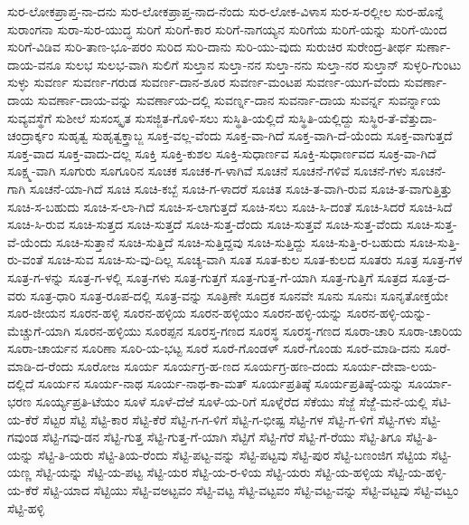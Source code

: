 ಸುರ-ಲೋಕಪ್ರಾಪ್ತ-ನಾ-ದನು
ಸುರ-ಲೋಕಪ್ರಾಪ್ತ-ನಾದ-ನೆಂದು
ಸುರ-ಲೋಕ-ವಿಳಾಸ
ಸುರ-ಸ-ರಲ್ಲೀಲ
ಸುರ-ಹೊನ್ನೆ
ಸುರಾಂಗನಾ
ಸುರಾ-ಸುರ-ಯುದ್ಧ
ಸುರಿಗೆ
ಸುರಿಗೆ-ಕಾರ
ಸುರಿಗೆ-ನಾಗಯ್ಯನ
ಸುರಿಗೆಯ
ಸುರಿಗೆ-ಯನ್ನು
ಸುರಿಗೆ-ಯಿಂದ
ಸುರಿಗೆ-ವಿಡಿವ
ಸುರಿ-ತಾಣ-ಭೂ-ಪರಂ
ಸುರಿದ
ಸುರಿ-ದಾನು
ಸುರಿ-ಯು-ವುದು
ಸುರುಚಿರ
ಸುರೇಂದ್ರ-ತೀರ್ಥ
ಸುರ್ಣಾ-ದಾಯ-ವನೂ
ಸುಲಭ
ಸುಲಭ-ವಾಗಿ
ಸುಲಿಗೆ
ಸುಲ್ತಾನ
ಸುಲ್ತಾ-ನನ
ಸುಲ್ತಾ-ನನು
ಸುಲ್ತಾ-ನರ
ಸುಲ್ತಾನ್
ಸುಳ್ಳರಿ-ಗುಂಟು
ಸುಳ್ಳು
ಸುವರ್ಣ
ಸುವರ್ಣ-ಗರುಡ
ಸುವರ್ಣ-ದಾನ-ಶೂರ
ಸುವರ್ಣ-ಮಂಟಪ
ಸುವರ್ಣ-ಯುಗ-ವೆಂದು
ಸುವರ್ಣಾ-ದಾಯ
ಸುವರ್ಣಾ-ದಾಯ-ವನ್ನು
ಸುವರ್ಣಾಯ-ದಲ್ಲಿ
ಸುವರ್ಣ್ನ-ದಾನ
ಸುವರ್ನಾ-ದಾಯ
ಸುವರ್ನ್ನ
ಸುವರ್ನ್ನಾಯ
ಸುವ್ಯವಸ್ಥೆಗೆ
ಸುಶೀಲೆ
ಸುಸಂಸ್ಕೃತ
ಸುಸಜ್ಜಿತ-ಗೊಳಿ-ಸಲು
ಸುಸ್ಥಿತಿ-ಯಲ್ಲಿದೆ
ಸುಸ್ಥಿತಿ-ಯಲ್ಲಿದ್ದು
ಸುಸ್ಥಿರ-ತೆ-ವೆತ್ತುದಾ-ಚಂದ್ರಾರ್ಕ್ಕಂ
ಸುಹೃತ್ವ
ಸುಹೃತ್ವಕ್ತ್ರಾಬ್ಜ
ಸೂಕ್ತ-ವಲ್ಲ-ವೆಂದು
ಸೂಕ್ತ-ವಾ-ಗಿದೆ
ಸೂಕ್ತ-ವಾಗಿ-ದೆ-ಯೆಂದು
ಸೂಕ್ತ-ವಾಗುತ್ತದೆ
ಸೂಕ್ತ-ವಾದ
ಸೂಕ್ತ-ವಾದು-ದಲ್ಲ
ಸೂಕ್ತಿ
ಸೂಕ್ತಿ-ಕುಶಲ
ಸೂಕ್ತಿ-ಸುಧಾರ್ಣವ
ಸೂಕ್ತಿ-ಸುಧಾರ್ಣವದ
ಸೂಕ್ರ-ವಾ-ಗಿದೆ
ಸೂಕ್ಷ್ಮ-ವಾಗಿ
ಸೂಗುರು
ಸೂಗೂರಿನ
ಸೂಚಕ
ಸೂಚಕ-ಗ-ಳಾಗಿವೆ
ಸೂಚನೆ
ಸೂಚನೆ-ಗಳಿವೆ
ಸೂಚನೆ-ಗಳು
ಸೂಚನೆ-ಗಾಗಿ
ಸೂಚನೆ-ಯಾ-ಗಿದೆ
ಸೂಚಿ
ಸೂಚಿ-ಕಬ್ಬೆ
ಸೂಚಿ-ಗ-ಳಾದರೆ
ಸೂಚಿತ
ಸೂಚಿ-ತ-ವಾಗಿ-ರುವ
ಸೂಚಿ-ತ-ವಾಗುತ್ತಿತ್ತು
ಸೂಚಿ-ಸ-ಬಹುದು
ಸೂಚಿ-ಸ-ಲಾ-ಗಿದೆ
ಸೂಚಿ-ಸ-ಲಾಗುತ್ತದೆ
ಸೂಚಿ-ಸಲು
ಸೂಚಿ-ಸಿ-ದಂತೆ
ಸೂಚಿ-ಸಿದರೆ
ಸೂಚಿ-ಸಿದೆ
ಸೂಚಿ-ಸಿ-ರುವ
ಸೂಚಿ-ಸುತ್ತದ
ಸೂಚಿ-ಸುತ್ತದೆ
ಸೂಚಿ-ಸುತ್ತ-ದೆಂದು
ಸೂಚಿ-ಸುತ್ತವೆ
ಸೂಚಿ-ಸುತ್ತ-ವೆಂದು
ಸೂಚಿ-ಸುತ್ತ-ವೆ-ಯೆಂದು
ಸೂಚಿ-ಸುತ್ತಾನೆ
ಸೂಚಿ-ಸುತ್ತಿದೆ
ಸೂಚಿ-ಸುತ್ತಿದ್ದವು
ಸೂಚಿ-ಸುತ್ತಿದ್ದು
ಸೂಚಿ-ಸುತ್ತಿ-ರ-ಬಹುದು
ಸೂಚಿ-ಸುತ್ತಿ-ರು-ವಂತೆ
ಸೂಚಿ-ಸುವ
ಸೂಚಿ-ಸು-ವು-ದಿಲ್ಲ
ಸೂಚ್ಯ-ವಾಗಿ
ಸೂತ
ಸೂತ-ಕುಲ
ಸೂತ-ಕುಲದ
ಸೂತರು
ಸೂತ್ರ
ಸೂತ್ರ-ಗಳ
ಸೂತ್ರ-ಗ-ಳನ್ನು
ಸೂತ್ರ-ಗ-ಳಲ್ಲಿ
ಸೂತ್ರ-ಗಳು
ಸೂತ್ರ-ಗುತ್ತಗೆ
ಸೂತ್ರ-ಗುತ್ತ-ಗೆ-ಯಾಗಿ
ಸೂತ್ರ-ಗುತ್ತಿಗೆ
ಸೂತ್ರದ
ಸೂತ್ರ-ದ-ವರು
ಸೂತ್ರ-ಧಾರಿ
ಸೂತ್ರ-ರೂಪ-ದಲ್ಲಿ
ಸೂತ್ರ-ವನ್ನು
ಸೂತ್ರಿಣೇ
ಸೂದ್ರಕ
ಸೂನವೇ
ಸೂನು
ಸೂನುಃ
ಸೂನೃತೋಕ್ತಯೇ
ಸೂರ-ಜೀಯನ
ಸೂರನ-ಹಳ್ಳಿ
ಸೂರನ-ಹಳ್ಳಿಯ
ಸೂರನ-ಹಳ್ಳಿಯಂ
ಸೂರನ-ಹಳ್ಳಿ-ಯನ್ನು
ಸೂರನ-ಹಳ್ಳಿ-ಯನ್ನು-ಮೆಚ್ಚುಗೆ-ಯಾಗಿ
ಸೂರನ-ಹಳ್ಳಿಯು
ಸೂರಪ್ಪನ
ಸೂರಸ್ತ-ಗಣದ
ಸೂರಸ್ಥ
ಸೂರಸ್ಥ-ಗಣದ
ಸೂರಾ-ಚಾರಿ
ಸೂರಾ-ಚಾರಿಯ
ಸೂರಾ-ಚಾರ್ಯನ
ಸೂರಿಣಾ
ಸೂರಿ-ಯ-ಭಟ್ಟ
ಸೂರೆ
ಸೂರೆ-ಗೊಂಡಳ್
ಸೂರೆ-ಗೊಂಡು
ಸೂರೆ-ಮಾಡಿ-ದನು
ಸೂರೆ-ಮಾಡಿ-ದ-ರೆಂದು
ಸೂರೋಜ
ಸೂರ್ಯ
ಸೂರ್ಯಗ್ರ-ಹ-ಣದ
ಸೂರ್ಯಗ್ರ-ಹಣ-ದಂದು
ಸೂರ್ಯ-ದೇವಾ-ಲಯ-ದಲ್ಲಿದೆ
ಸೂರ್ಯನ
ಸೂರ್ಯ-ನಾಥ
ಸೂರ್ಯ-ನಾಥ-ಕಾ-ಮತ್
ಸೂರ್ಯಪ್ರತಿಷ್ಠೆ
ಸೂರ್ಯಪ್ರತಿಷ್ಠೆ-ಯನ್ನು
ಸೂರ್ಯಾ-ಭರಣ
ಸೂರ್ಯ್ಯಪ್ರತಿ-ಟೆಯಂ
ಸೂಳೆ
ಸೂಳೆ-ದೆಱೆ
ಸೂಳೆ-ಯ-ರಿಗೆ
ಸೂಳ್ನೆರೆದ
ಸೆಕೆಯು
ಸೆಜ್ಜೆ
ಸೆಜ್ಜೆೆ-ಮನೆ-ಯಲ್ಲಿ
ಸೆಟಿ-ಯ-ಕೆರೆ
ಸೆಟ್ಟರ
ಸೆಟ್ಟಿ
ಸೆಟ್ಟಿ-ಕಾರ
ಸೆಟ್ಟಿ-ಕೆರೆ
ಸೆಟ್ಟಿ-ಗ-ಗ-ಳಿಗೆ
ಸೆಟ್ಟಿ-ಗ-ಭೀಷ್ಟ
ಸೆಟ್ಟಿ-ಗಳ
ಸೆಟ್ಟಿ-ಗ-ಳಿಗೆ
ಸೆಟ್ಟಿ-ಗಳು
ಸೆಟ್ಟಿ-ಗವುಂಡ
ಸೆಟ್ಟಿ-ಗವು-ಡನ
ಸೆಟ್ಟಿ-ಗುತ್ತ
ಸೆಟ್ಟಿ-ಗುತ್ತ-ಗೆ-ಯಾಗಿ
ಸೆಟ್ಟಿಗೆ
ಸೆಟ್ಟಿ-ಗೆರೆ
ಸೆಟ್ಟಿ-ಗೆ-ರೆಯು
ಸೆಟ್ಟಿ-ತಿಗೂ
ಸೆಟ್ಟಿ-ತಿ-ಯನ್ನು
ಸೆಟ್ಟಿ-ತಿ-ಯರು
ಸೆಟ್ಟಿ-ತಿಯ-ರೆಂದು
ಸೆಟ್ಟಿ-ಪಟ್ಟ-ವನ್ನು
ಸೆಟ್ಟಿ-ಪಟ್ಟವು
ಸೆಟ್ಟಿ-ಪುರ
ಸೆಟ್ಟಿ-ಬಣಂಜಿಗ
ಸೆಟ್ಟಿಯ
ಸೆಟ್ಟಿ-ಯಣ್ಣ
ಸೆಟ್ಟಿ-ಯನ್ನು
ಸೆಟ್ಟಿ-ಯ-ಪಟ್ಟ
ಸೆಟ್ಟಿ-ಯರ
ಸೆಟ್ಟಿ-ಯ-ರ-ಳಿಯ
ಸೆಟ್ಟಿ-ಯರು
ಸೆಟ್ಟಿ-ಯ-ಹಳ್ಳಿಯ
ಸೆಟ್ಟಿ-ಯ-ಹಳ್ಳಿ-ಯ-ಕೆರೆ
ಸೆಟ್ಟಿ-ಯಾದ
ಸೆಟ್ಟಿಯು
ಸೆಟ್ಟಿ-ವಅಟ್ಟವಂ
ಸೆಟ್ಟಿ-ವಟ್ಟ
ಸೆಟ್ಟಿ-ವಟ್ಟವಂ
ಸೆಟ್ಟಿ-ವಟ್ಟ-ವನ್ನು
ಸೆಟ್ಟಿ-ವಟ್ಟವು
ಸೆಟ್ಟಿ-ವಟ್ವಂ
ಸೆಟ್ಟಿ-ಹಳ್ಳಿ
